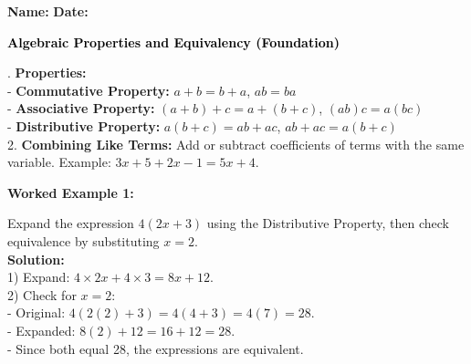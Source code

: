 \documentclass[12pt, letterpaper, fleqn]{article}
\begin{document}
\textbf{Name:} \underline{\hspace{5cm}}
\hfill
\textbf{Date:} \underline{\hspace{3cm}}\\

\begin{tcolorbox}[colback=black!10]
    \large\textcolor{black}{\textbf{Algebraic Properties and Equivalency (Foundation)}}
\end{tcolorbox}

\vspace{3mm}

. \textbf{Properties:} \\
- \textbf{Commutative Property:} $a + b = b + a$, \quad $ab = ba$ \\
- \textbf{Associative Property:} $(a+b)+c = a+(b+c)$, \quad $(ab)c = a(bc)$ \\
- \textbf{Distributive Property:} $a(b+c) = ab + ac$, \quad $ab + ac = a(b+c)$ \\
2. \textbf{Combining Like Terms:} Add or subtract coefficients of terms with the same variable. Example: $3x + 5 + 2x - 1 = 5x + 4$.

\vspace{4mm}

\begin{tcolorbox}[colback=white, colframe=black!25, boxrule=0.6pt, arc=4mm, left=6mm, right=6mm, top=5mm, bottom=5mm]
\textbf{Worked Example 1:}

\medskip
\noindent
Expand the expression $4(2x + 3)$ using the Distributive Property, then check equivalence by substituting $x=2$.\\
\textbf{Solution:} \\
1) Expand: $4 \times 2x + 4 \times 3 = 8x + 12$. \\
2) Check for $x=2$: \\
- Original: $4(2(2) + 3) = 4(4 + 3) = 4(7) = 28$. \\
- Expanded: $8(2) + 12 = 16 + 12 = 28$. \\
- Since both equal 28, the expressions are equivalent.
\end{tcolorbox}

\vspace{1cm}
\end{document}
